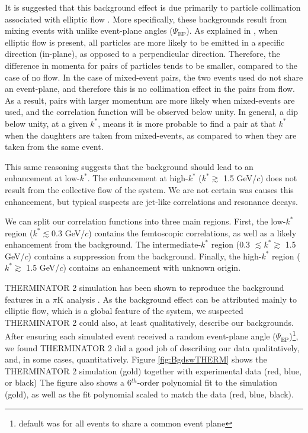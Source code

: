 \documentclass[../AnalysisNoteJBuxton.tex]{subfiles}
\begin{document}
It is suggested that this background effect is due primarily to particle collimation associated with elliptic flow \cite{Kisiel:2017}.  More specifically, these backgrounds result from mixing events with unlike event-plane angles ($\Psi_{\textrm{EP}}$).  As explained in \cite{Kisiel:2017}, when elliptic flow is present, all particles are more likely to be emitted in a specific direction (in-plane), as opposed to a perpendicular direction.  Therefore, the difference in momenta for pairs of particles tends to be smaller, compared to the case of no flow.  In the case of mixed-event pairs, the two events used do not share an event-plane, and therefore this is no collimation effect in the pairs from flow.  As a result, pairs with larger momentum are more likely when mixed-events are used, and the correlation function will be observed below unity.  In general, a dip below unity, at a given $k^{*}$, means it is more probable to find a pair at that $k^{*}$ when the daughters are taken from mixed-events, as compared to when they are taken from the same event.

This same reasoning suggests that the background should lead to an enhancement at low-$k^{*}$.  The enhancement at high-$k^{*}$ ($k^{*} \gtrsim$ 1.5 GeV/$c$) does not result from the collective flow of the system.  We are not certain was causes this enhancement, but typical suspects are jet-like correlations and resonance decays.

We can split our correlation functions into three main regions.  First, the low-$k^{*}$ region ($k^{*} \lesssim 0.3$ GeV/$c$) contains the femtoscopic correlations, as well as a likely enhancement from the background.  The intermediate-$k^{*}$ region (0.3 $\lesssim k^{*} \gtrsim$ 1.5 GeV/$c$) contains a suppression from the background.  Finally, the high-$k^{*}$ region ($k^{*} \gtrsim$ 1.5 GeV/$c$) contains an enhancement with unknown origin.

THERMINATOR 2 simulation has been shown to reproduce the background features in a $\pi$K analysis \cite{Kisiel:2017}.  As the background effect can be attributed mainly to elliptic flow, which is a global feature of the system, we suspected THERMINATOR 2 could also, at least qualitatively, describe our backgrounds.  After ensuring each simulated event received a random event-plane angle ($\Psi_{\mathrm{EP}}$)\footnote{default was for all events to share a common event plane}, we found THERMINATOR 2 did a good job of describing our data qualitatively, and, in some cases, quantitatively.  Figure \ref{fig:BgdswTHERM} shows the THERMINATOR 2 simulation (gold) together with experimental data (red, blue, or black)  The figure also shows a 6$^{th}$-order polynomial fit to the simulation (gold), as well as the fit polynomial scaled to match the data (red, blue, black).  
\end{document}
